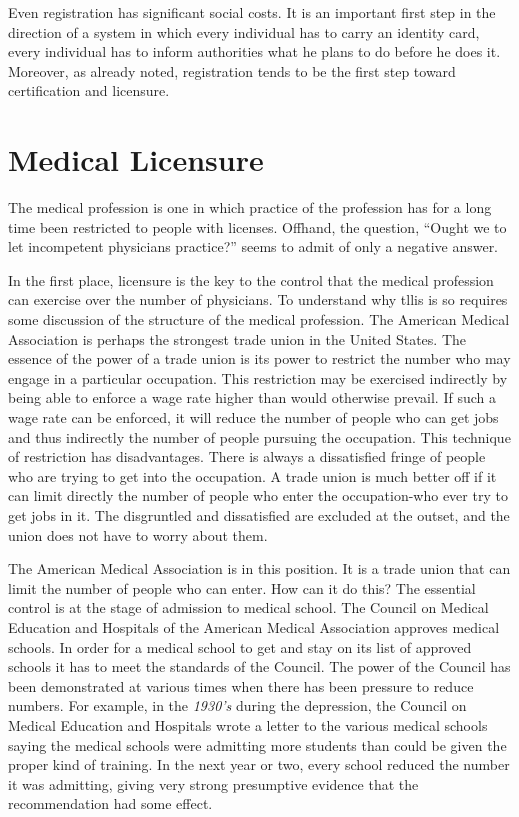 \documentclass[11pt,openany]{book}
\newcommand{\booksection}[1]{%
  \phantomsection\section*{#1}%
  \addcontentsline{toc}{section}{#1}\markright{#1}}
\begin{document}
Even registration has significant social costs. It is an important first step in the direction of a system in which every individual has to carry an identity card, every individual has to inform authorities what he plans to do before he does it. Moreover, as already noted, registration tends to be the first step toward certification and licensure.

\booksection{Medical Licensure}

The medical profession is one in which practice of the profession has for a long time been restricted to people with licenses. Offhand, the question, ``Ought we to let incompetent physicians practice?'' seems to admit of only a negative answer.

In the first place, licensure is the key to the control that the medical profession can exercise over the number of physicians. To understand why tllis is so requires some discussion of the structure of the medical profession. The American Medical Association is perhaps the strongest trade union in the United States. The essence of the power of a trade union is its power to restrict the number who may engage in a particular occupation. This restriction may be exercised indirectly by being able to enforce a wage rate higher than would otherwise prevail. If such a wage rate can be enforced, it will reduce the number of people who can get jobs and thus indirectly the number of people pursuing the occupation. This technique of restriction has disadvantages. There is always a dissatisfied fringe of people who are trying to get into the occupation. A trade union is much better off if it can limit directly the number of people who enter the occupation-who ever try to get jobs in it. The disgruntled and dissatisfied are excluded at the outset, and the union does not have to worry about them.

The American Medical Association is in this position. It is a trade union that can limit the number of people who can enter. How can it do this? The essential control is at the stage of admission to medical school. The Council on Medical Education and Hospitals of the American Medical Association approves medical schools. In order for a medical school to get and stay on its list of approved schools it has to meet the standards of the Council. The power of the Council has been demonstrated at various times when there has been pressure to reduce numbers. For example, in the \emph{1930's} during the depression, the Council on Medical Education and Hospitals wrote a letter to the various medical schools saying the medical schools were admitting more students than could be given the proper kind of training. In the next year or two, every school reduced the number it was admitting, giving very strong presumptive evidence that the recommendation had some effect.
\end{document}
